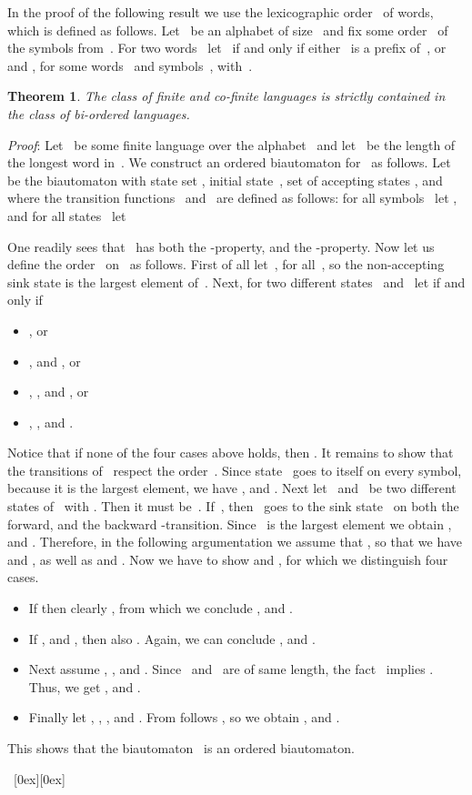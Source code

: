 \documentclass[submission]{eptcs}
\newcommand*{\qed}{\raisebox{0.5ex}[0ex][0ex]{\framebox[1ex][l]{}}}
\newtheorem{theorem}{Theorem}
\newenvironment{proof}{\par\noindent
  {\rmfamily\itshape\mdseries Proof\/}:\hspace{\labelsep}\ignorespaces}{\mbox{}\nolinebreak\hfill~{\qed}
  \medbreak
}
\begin{document}
In the proof of the following result we use the lexicographic
order~ of words, which is defined as follows.
Let~ be an alphabet of size~ and fix some
order~ of the symbols from~.  For two
words~ let~ if and only if
either~ is a prefix of~, or  and , for some words~ and
symbols~, with~.

\begin{theorem}\label{thm:finite-strictly-in-bi-ordered}
  The class of finite and co-finite languages is strictly contained in
  the class of bi-ordered languages.
\end{theorem}

\begin{proof}
  Let~ be some finite language over the alphabet~ and
  let~ be the length of the longest word in~.  We construct
  an ordered biautomaton for~ as follows.  Let
   be the biautomaton with state set
,
initial state~, set of accepting states
,
and where the transition functions~ and~ are defined
  as follows: for all symbols~ let , and for all states~ let
  
  One readily sees that~ has both the -property, and the
  -property.  Now let us define the order~ on~ as follows.
  First of all let~, for all~, so the
  non-accepting sink state is the largest element of~.  Next, for
  two different states~ and~ let  if and only if
  \begin{itemize}
  \item , or
  \item , and , or
  \item , , and
    , or
  \item , , and .
  \end{itemize}
  Notice that if none of the four cases above holds, then
  .  It remains to show that the transitions
  of~ respect the order~.  Since state~ goes to itself on
  every symbol, because it is the largest element, we have , and .  Next
  let~ and~ be two different states of~ with
  .  Then it must be~.  If~, then~
  goes to the sink state~ on both the forward, and the backward
  -transition.  Since~ is the largest element we obtain
  , and .  Therefore, in the following argumentation we
  assume that , so that we have  and , as well as
   and .
  Now we have to show  and , for which we distinguish four cases.
  \begin{itemize}
  \item If  then clearly , from which we conclude , and .
  \item If , and ,
    then also .  Again, we can conclude
    , and .
  \item Next assume , , and .  Since~ and~
    are of same length, the fact~ implies
    .  Thus, we get , and .
  \item Finally let , , , and .  From  follows , so we
    obtain , and .
  \end{itemize}
  This shows that the biautomaton~ is an ordered biautomaton.


\end{proof}
\end{document}
